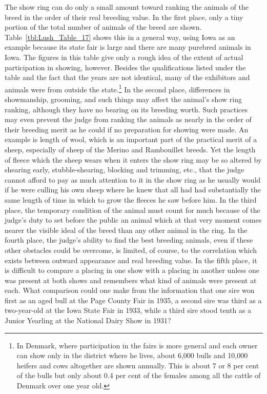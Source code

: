 The show ring can do only a small amount toward ranking the animals
of the breed in the order of their real breeding value. In the first
place, only a tiny portion of the total number of animals of the breed
are shown. Table~\ref{tbl:Lush_Table_17}
shows this in a general way, using Iowa as an example
because its state fair is large and there are many purebred animals
in Iowa. The figures in this table give only a rough idea of the extent of
actual participation in showing, however. Besides the qualifications
listed under the table and the fact that the years are not identical, many
of the exhibitors and animals were from outside the state.\footnote{In
Denmark, where participation in the fairs is more general and each owner
can show only in the district where he lives, about 6,000 bulls and 10,000 
heifers and cows altogether are shown annually. This is about 7 or 8 per
cent of the bulls but only about 0.4 per cent of the females among all
the cattle of Denmark over one year old.} In the second
place, differences in showmanship, grooming, and such things may
affect the animal's show ring ranking, although they have no bearing on
its breeding worth. Such practices may even prevent the judge from
ranking the animals as nearly in the order of their breeding merit as he
could if no preparation for showing were made. An example is length
of wool, which is an important part of the practical merit of a sheep,
especially of sheep of the Merino and Rambouillet breeds. Yet the
length of fleece which the sheep wears when it enters the show ring
may be so altered by shearing early, stubble-shearing, blocking and
trimming, etc., that the judge cannot afford to pay as much attention to
it in the show ring as he usually would if he were culling his own sheep
where he knew that all had had substantially the same length of time
in which to grow the fleeces he saw before him. In the third place, the
temporary condition of the animal must count for much because of the
judge's duty to set before the public an animal which at that very
moment comes nearer the visible ideal of the breed than any other animal
in the ring. In the fourth place, the judge's ability to find the best
breeding animals, even if these other obstacles could be overcome, is
limited, of course, to the correlation which exists between outward
appearance and real breeding value. In the fifth place, it is difficult to
compare a placing in one show with a placing in another unless one was
present at both shows and remembers what kind of animals were present
at each. What comparison could one make from the information
that one sire won first as an aged bull at the Page County Fair in 1935, a
second sire was third as a two-year-old at the Iowa State Fair in 1933,
while a third sire stood tenth as a Junior Yearling at the National Dairy
Show in 1931?

